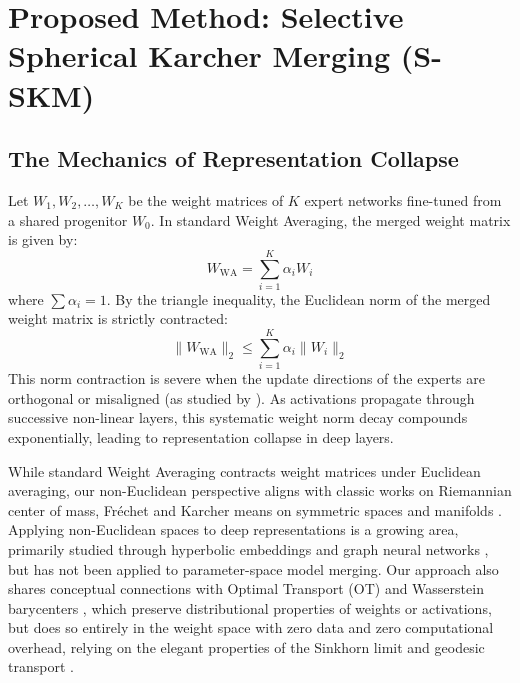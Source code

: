 \documentclass{article}
\begin{document}
\section{Proposed Method: Selective Spherical Karcher Merging (S-SKM)}
\subsection{The Mechanics of Representation Collapse}
Let $W_1, W_2, \dots, W_K$ be the weight matrices of $K$ expert networks fine-tuned from a shared progenitor $W_0$. In standard Weight Averaging, the merged weight matrix is given by:
\begin{equation}
  W_{\text{WA}} = \sum_{i=1}^K \alpha_i W_i
\end{equation}
where $\sum \alpha_i = 1$. By the triangle inequality, the Euclidean norm of the merged weight matrix is strictly contracted:
\begin{equation}
  \|W_{\text{WA}}\|_2 \le \sum_{i=1}^K \alpha_i \|W_i\|_2
\end{equation}
This norm contraction is severe when the update directions of the experts are orthogonal or misaligned (as studied by \cite{methodologist2026confounder}). As activations propagate through successive non-linear layers, this systematic weight norm decay compounds exponentially, leading to representation collapse in deep layers.

While standard Weight Averaging contracts weight matrices under Euclidean averaging, our non-Euclidean perspective aligns with classic works on Riemannian center of mass, Fr\'{e}chet and Karcher means on symmetric spaces and manifolds \cite{karcher1977riemannian,frechet1948elements,bini2013computing,fletcher2004principal,pennec2006riemannian,absil2009optimization,barycentric_herrera}. Applying non-Euclidean spaces to deep representations is a growing area, primarily studied through hyperbolic embeddings and graph neural networks \cite{ganea2018hyperbolic,chami2019hyperbolic,mathieu2019continuous}, but has not been applied to parameter-space model merging. Our approach also shares conceptual connections with Optimal Transport (OT) and Wasserstein barycenters \cite{barycenter_wasserstein,cuturi2014fast,peyre2019computational}, which preserve distributional properties of weights or activations, but does so entirely in the weight space with zero data and zero computational overhead, relying on the elegant properties of the Sinkhorn limit and geodesic transport \cite{sinkhorn1964relationship}.
\end{document}
